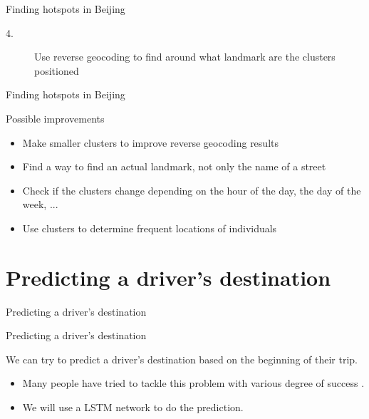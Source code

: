 \documentclass[aspectratio=169]{beamer}
\begin{document}
\begin{frame}{Finding hotspots in Beijing}
\begin{center}
\begin{description}
	\item [4.] Use reverse geocoding to find around what landmark are the clusters positioned
\end{description}
{\small }
\end{center}
\end{frame}

\begin{frame}{Finding hotspots in Beijing}

{\Large Possible improvements}
\vspace{.5cm}
\begin{itemize}
	\item Make smaller clusters to improve reverse geocoding results
	\item Find a way to find an actual landmark, not only the name of a street
	\item Check if the clusters change depending on the hour of the day, the day of the week, ...
	\item Use clusters to determine frequent locations of individuals
\end{itemize}
\end{frame}


\section{Predicting a driver's destination}

\begin{frame}{Predicting a driver's destination}

\begin{center}
{\LARGE Predicting a driver's destination}
\end{center}

We can try to predict a driver's destination based on the beginning of their trip.
\vspace{.5cm}

\begin{itemize}
	\item Many people have tried to tackle this problem with various degree of success \cite{de2015artificial, krumm2006predestination}.
	\item We will use a LSTM network to do the prediction.
\end{itemize}
\end{frame}
\end{document}
